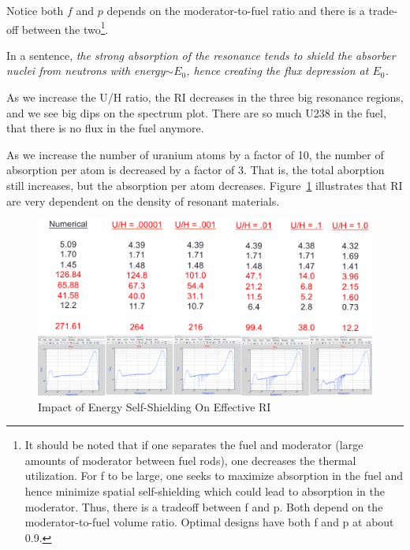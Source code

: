\documentclass{school-22.211-notes}
\begin{document}
Notice both $f$ and $p$ depends on the moderator-to-fuel ratio and there is a trade-off
between the two\footnote{It should be noted that if one separates the fuel and moderator (large amounts of
moderator between fuel rods), one decreases the thermal utilization. For f to be
large, one seeks to maximize absorption in the fuel and hence minimize spatial
self-shielding which could lead to absorption in the moderator. Thus, there is a
tradeoff between f and p. Both depend on the moderator-to-fuel volume ratio.
Optimal designs have both f and p at about 0.9.}. 

In a sentence, \textit{the strong absorption of the resonance tends to shield the absorber nuclei from neutrons with energy$\sim E_0$, hence creating the flux depression at $E_0$.}

As we increase the U/H ratio, the RI decreases in the three big resonance regions, and we see big dips on the spectrum plot. There are so much U238 in the fuel, that there is no flux in the fuel anymore. 

As we increase the number of uranium atoms by a factor of 10, the number of absorption per atom is decreased by a factor of 3. That is, the total aborption still increases, but the absorption per atom decreases. Figure~\ref{energy-self-shielding} illustrates that RI are very dependent on the density of resonant materials.
\begin{figure}
  \centering
  \includegraphics[width=4.5in]{images/r-m/self-shielding.png}
  \caption{Impact of Energy Self-Shielding On Effective RI} \label{energy-self-shielding}
\end{figure}
\end{document}
